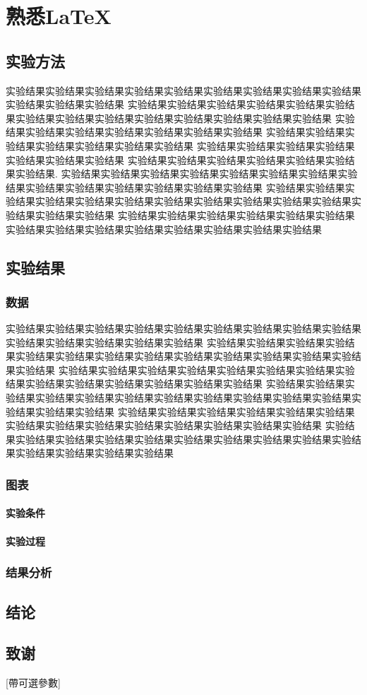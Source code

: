 \documentclass{cfg}
\begin{document}
\chapter{熟悉\LaTeX}
\section{实验方法}
\xutab %
实验结果实验结果实验结果实验结果实验结果实验结果实验结果实验结果实验结果实验结果实验结果实验结果
实验结果实验结果实验结果实验结果实验结果实验结果实验结果实验结果实验结果实验结果实验结果实验结果实验结果实验结果
实验结果实验结果实验结果实验结果实验结果实验结果实验结果
实验结果实验结果实验结果实验结果实验结果实验结果实验结果
实验结果实验结果实验结果实验结果实验结果实验结果实验结果
实验结果实验结果实验结果实验结果实验结果实验结果实验结果.
\xutab
实验结果实验结果实验结果实验结果实验结果实验结果实验结果实验结果实验结果实验结果实验结果实验结果实验结果实验结果
实验结果实验结果实验结果实验结果实验结果实验结果实验结果实验结果实验结果实验结果实验结果实验结果实验结果实验结果
实验结果实验结果实验结果实验结果实验结果实验结果实验结果实验结果实验结果实验结果实验结果实验结果实验结果实验结果

\section{实验结果}
\subsection{数据}
实验结果实验结果实验结果实验结果实验结果实验结果实验结果实验结果实验结果实验结果实验结果实验结果实验结果实验结果
实验结果实验结果实验结果实验结果实验结果实验结果实验结果实验结果实验结果实验结果实验结果实验结果实验结果实验结果
实验结果实验结果实验结果实验结果实验结果实验结果实验结果实验结果实验结果实验结果实验结果实验结果实验结果实验结果
实验结果实验结果实验结果实验结果实验结果实验结果实验结果实验结果实验结果实验结果实验结果实验结果实验结果实验结果
实验结果实验结果实验结果实验结果实验结果实验结果实验结果实验结果实验结果实验结果实验结果实验结果实验结果实验结果
实验结果实验结果实验结果实验结果实验结果实验结果实验结果实验结果实验结果实验结果实验结果实验结果实验结果实验结果


\subsection{图表}
\subsubsection{实验条件}
\subsubsection{实验过程}
\subsection{结果分析}
\section{结论}
\section{致谢}

[帶可選參數]

\ExplSyntaxOff
\end{document}
